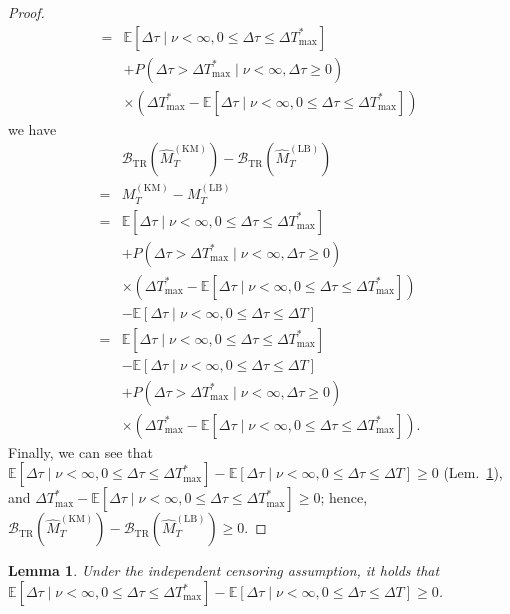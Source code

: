 \documentclass{article}
\theoremstyle{plain}
\newtheorem{lemma}[theorem]{Lemma}
\theoremstyle{definition}
\theoremstyle{remark}
\def\nn{\nonumber \\ }
\def\mbe{\mathbb{E}}
\begin{document}
\begin{proof}
\begin{align}
        =& \mbe[ \Delta \tau \mid \nu < \infty, 0 \leq \Delta \tau \leq \Delta T_\mathrm{max}^*] \nn
            &+  P(\Delta \tau > \Delta T_\mathrm{max}^* \mid \nu < \infty, \Delta \tau \geq 0) \nn 
            &\times (\Delta T_\mathrm{max}^* - \mbe[ \Delta \tau \mid \nu < \infty,  0 \leq \Delta \tau \leq \Delta T_\mathrm{max}^*])
    \end{align}
    we have 
    \begin{align}
        &\mathcal{B}_\mathrm{TR}(\hat{M}_T^\mathrm{(KM)}) - \mathcal{B}_\mathrm{TR}(\hat{M}_T^\mathrm{(LB)}) \nn
        =&  M_T^{\mathrm{(KM)}}  - M_T^{\mathrm{(LB)}} \\
        =& \mbe[ \Delta \tau \mid \nu < \infty, 0 \leq  \Delta \tau \leq \Delta T_\mathrm{max}^*] \nn
            &+  P(\Delta \tau > \Delta T_\mathrm{max}^* \mid \nu < \infty, \Delta \tau \geq 0) \nn
            &\times (\Delta T_\mathrm{max}^* - \mbe[ \Delta \tau \mid \nu < \infty, 0 \leq  \Delta \tau \leq \Delta T_\mathrm{max}^*]) \nn
            &- \mbe[\Delta \tau \mid \nu < \infty, 0 \leq \Delta \tau \leq \Delta T] \\
        =& \mbe[ \Delta \tau \mid \nu < \infty, 0 \leq \Delta \tau \leq \Delta T_\mathrm{max}^*] \nn
            &- \mbe[\Delta \tau \mid \nu < \infty, 0 \leq \Delta \tau \leq \Delta T] \nn
            &+  P(\Delta \tau > \Delta T_\mathrm{max}^* \mid \nu < \infty, \Delta \tau \geq 0) \nn 
            &\times (\Delta T_\mathrm{max}^* - \mbe[ \Delta \tau \mid \nu < \infty, 0 \leq  \Delta \tau \leq \Delta T_\mathrm{max}^*]). 
    \end{align}
        Finally, we can see that 
        $\mbe[ \Delta \tau \mid \nu < \infty, 0 \leq \Delta \tau \leq \Delta  T_\mathrm{max}^*] 
        - \mbe[\Delta \tau \mid \nu < \infty, 0 \leq \Delta \tau \leq \Delta T] 
        \geq 0$ (Lem.~\ref{lem:ADD_last_inequality}), and
        $\Delta T_\mathrm{max}^* - \mbe[ \Delta \tau \mid \nu < \infty, 0 \leq \Delta \tau \leq \Delta T_\mathrm{max}^*] \geq 0$;
        hence, $\mathcal{B}_\mathrm{TR}(\hat{M}_T^\mathrm{(KM)}) - \mathcal{B}_\mathrm{TR}(\hat{M}_T^\mathrm{(LB)}) \geq 0$.

\end{proof}


\begin{lemma} \label{lem:ADD_last_inequality}
    Under the independent censoring assumption, it holds that
    $\mbe[ \Delta \tau \mid \nu < \infty, 0 \leq \Delta \tau \leq \Delta  T_\mathrm{max}^*] 
    - \mbe[\Delta \tau \mid \nu < \infty, 0 \leq \Delta \tau \leq \Delta T] 
    \geq 0$.
\end{lemma}
\end{document}
